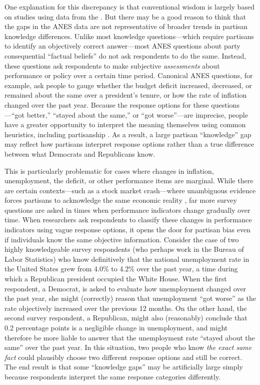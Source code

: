 \documentclass[12pt, letterpaper]{article}
\begin{document}
One explanation for this discrepancy is that conventional wisdom is largely based on studies using data from the \citet{anes_gen}. But there may be a good reason to think that the gaps in the ANES data are not representative of broader trends in partisan knowledge differences. Unlike most knowledge questions---which require partisans to identify an objectively correct answer---most ANES questions about party consequential ``factual beliefs'' do not ask respondents to do the same. Instead, these questions ask respondents to make subjective \textit{assessments} about performance or policy over a certain time period. Canonical ANES questions, for example, ask people to gauge whether the budget deficit increased, decreased, or remained about the same over a president's tenure, or how the rate of inflation changed over the past year. Because the response options for these questions---``got better,'' ``stayed about the same,'' or ``got worse''---are imprecise, people have a greater opportunity to interpret the meaning themselves \citep[e.g.][]{beyth_1982} using common heuristics, including partisanship \citep[e.g.][]{soodguess_2017}. As a result, a large partisan ``knowledge'' gap may reflect how partisans interpret response options rather than a true difference between what Democrats and Republicans know.

This is particularly problematic for cases where changes in inflation, unemployment, the deficit, or other performance items are marginal. While there are certain contexts---such as a stock market crash---where unambiguous evidence forces partisans to acknowledge the same economic reality \citep[e.g.][]{bisgaard2015bias,parkerstephen_2013}, far more survey questions are asked in times when performance indicators change gradually over time. When researchers ask respondents to classify these changes in performance indicators using vague response options, it opens the door for partisan bias even if individuals know the same objective information. Consider the case of two highly knowledgeable survey respondents (who perhaps work in the Bureau of Labor Statistics) who know definitively that the national unemployment rate in the United States grew from 4.0\% to 4.2\% over the past year, a time during which a Republican president occupied the White House. When the first respondent, a Democrat, is asked to evaluate how unemployment changed over the past year, she might (correctly) reason that unemployment ``got worse'' as the rate objectively increased over the previous 12 months. On the other hand, the second survey respondent, a Republican, might also (reasonably) conclude that 0.2 percentage points is a negligible change in unemployment, and might therefore be more liable to answer that the unemployment rate  ``stayed about the same'' over the past year. In this situation, two people who know \textit{the exact same fact} could plausibly choose two different response options and still be correct. The end result is that some ``knowledge gaps'' may be artificially large simply because respondents interpret the same response categories differently. 
\end{document}
